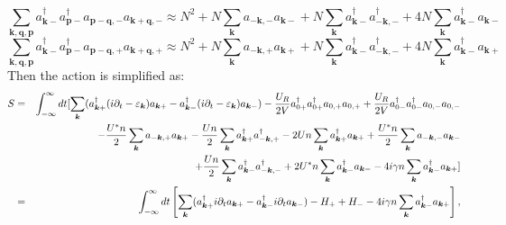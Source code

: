 \documentclass{article}
\newcommand{\nobracket}{}
\newcommand{\tmmathbf}[1]{\ensuremath{\boldsymbol{#1}}}
\begin{document}
\begin{equation}
  \sum_{\tmmathbf{k}, \tmmathbf{q}, \tmmathbf{p}} a_{\tmmathbf{k}-}^{\dagger}
  a_{\tmmathbf{p}-}^{\dagger} a_{\tmmathbf{p}-\tmmathbf{q}, -}
  a_{\tmmathbf{k}+\tmmathbf{q}, -} \approx N^2 + N \sum_{\tmmathbf{k}}
  a_{-\tmmathbf{k}, -} a_{\tmmathbf{k}-} + N \sum_{\tmmathbf{k}}
  a_{\tmmathbf{k}-}^{\dagger} a_{-\tmmathbf{k}, -}^{\dagger} + 4 N
  \sum_{\tmmathbf{k}} a_{\tmmathbf{k}-}^{\dagger} a_{\tmmathbf{k}-}
\end{equation}
\begin{equation}
  \sum_{\tmmathbf{k}, \tmmathbf{q}, \tmmathbf{p}} a_{\tmmathbf{k}-}^{\dagger}
  a_{\tmmathbf{p}-}^{\dagger} a_{\tmmathbf{p}-\tmmathbf{q}, +}
  a_{\tmmathbf{k}+\tmmathbf{q}, +} \approx N^2 + N \sum_{\tmmathbf{k}}
  a_{-\tmmathbf{k}, +} a_{\tmmathbf{k}+} + N \sum_{\tmmathbf{k}}
  a_{\tmmathbf{k}-}^{\dagger} a_{-\tmmathbf{k}, -}^{\dagger} + 4 N
  \sum_{\tmmathbf{k}} a_{\tmmathbf{k}-}^{\dagger} a_{\tmmathbf{k}+}
  \label{mean3}
\end{equation}
Then the action is simplified as:
\begin{eqnarray}
  S & = & \int_{- \infty}^{\infty} d t [\nobracket \sum_{\tmmathbf{k}}
  (a^{\dagger}_{\tmmathbf{k}+} (i \partial_t - \varepsilon_{\tmmathbf{k}})
  a_{\tmmathbf{k}+} - a^{\dagger}_{\tmmathbf{k}-} (i \partial_t -
  \varepsilon_{\tmmathbf{k}}) a_{\tmmathbf{k}-}) - \frac{U_R}{2 V} a_{0
  +}^{\dagger} a_{0 +}^{\dagger} a_{0, +} a_{0, +} + \frac{U_R}{2 V} a_{0
  -}^{\dagger} a_{0 -}^{\dagger} a_{0, -} a_{0, -} \nonumber\\
  &  & - \frac{U^{\ast} n}{2} \sum_{\tmmathbf{k}} a_{-\tmmathbf{k}, +}
  a_{\tmmathbf{k}+} - \frac{U n}{2} \sum_{\tmmathbf{k}}
  a_{\tmmathbf{k}+}^{\dagger} a_{-\tmmathbf{k}, +}^{\dagger} - 2 U n
  \sum_{\tmmathbf{k}} a_{\tmmathbf{k}+}^{\dagger} a_{\tmmathbf{k}+} +
  \frac{U^{\ast} n}{2} \sum_{\tmmathbf{k}} a_{-\tmmathbf{k}, -}
  a_{\tmmathbf{k}-} \nonumber\\
  &  & + \frac{U n}{2} \sum_{\tmmathbf{k}} a_{\tmmathbf{k}-}^{\dagger}
  a_{-\tmmathbf{k}, -}^{\dagger} + 2 U^{\ast} n \sum_{\tmmathbf{k}}
  a_{\tmmathbf{k}-}^{\dagger} a_{\tmmathbf{k}-} - 4 i \gamma n
  \sum_{\tmmathbf{k}} a_{\tmmathbf{k}-}^{\dagger} a_{\tmmathbf{k}+}
  \large{\large{}] \nobracket} \\
  & = & \int_{- \infty}^{\infty} d t \left[ \sum_{\tmmathbf{k}}
  (a^{\dagger}_{\tmmathbf{k}+} i \partial_t a_{\tmmathbf{k}+} -
  a^{\dagger}_{\tmmathbf{k}-} i \partial_t a_{\tmmathbf{k}-}) - H_+ + H_- - 4
  i \gamma n \sum_{\tmmathbf{k}} a_{\tmmathbf{k}-}^{\dagger} a_{\tmmathbf{k}+}
  \right], \label{action} 
\end{eqnarray}
\end{document}

